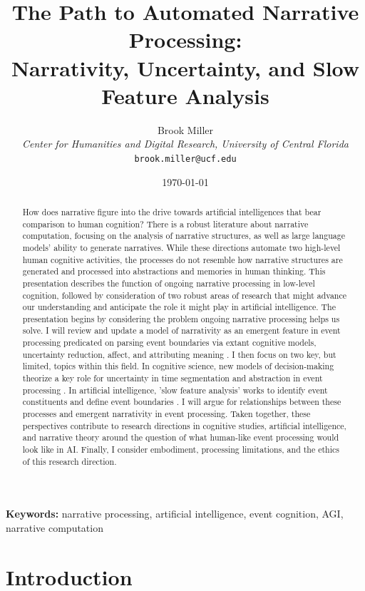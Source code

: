 \documentclass[11pt,a4paper]{article}
\title{The Path to Automated Narrative Processing: \\
       Narrativity, Uncertainty, and Slow Feature Analysis}
\author{Brook Miller\\
        \textit{Center for Humanities and Digital Research, University of Central Florida}\\
        \texttt{brook.miller@ucf.edu}}
\date{\today}
\begin{document}
\maketitle

\begin{abstract}
How does narrative figure into the drive towards artificial intelligences that bear comparison to human cognition? There is a robust literature about narrative computation, focusing on the analysis of narrative structures, as well as large language models' ability to generate narratives. While these directions automate two high-level human cognitive activities, the processes do not resemble how narrative structures are generated and processed into abstractions and memories in human thinking. This presentation describes the function of ongoing narrative processing in low-level cognition, followed by consideration of two robust areas of research that might advance our understanding and anticipate the role it might play in artificial intelligence. The presentation begins by considering the problem ongoing narrative processing helps us solve. I will review and update a model of narrativity as an emergent feature in event processing predicated on parsing event boundaries via extant cognitive models, uncertainty reduction, affect, and attributing meaning \citep{miller2024narrativity}. I then focus on two key, but limited, topics within this field. In cognitive science, new models of decision-making theorize a key role for uncertainty in time segmentation and abstraction in event processing \citep{wang2025neural}. In artificial intelligence, 'slow feature analysis' works to identify event constituents and define event boundaries \citep{song2022slow}. I will argue for relationships between these processes and emergent narrativity in event processing. Taken together, these perspectives contribute to research directions in cognitive studies, artificial intelligence, and narrative theory around the question of what human-like event processing would look like in AI. Finally, I consider embodiment, processing limitations, and the ethics of this research direction.

\end{abstract}

\textbf{Keywords:} narrative processing, artificial intelligence, event cognition, AGI, narrative computation

\section{Introduction}
\label{sec:introduction}
\end{document}
